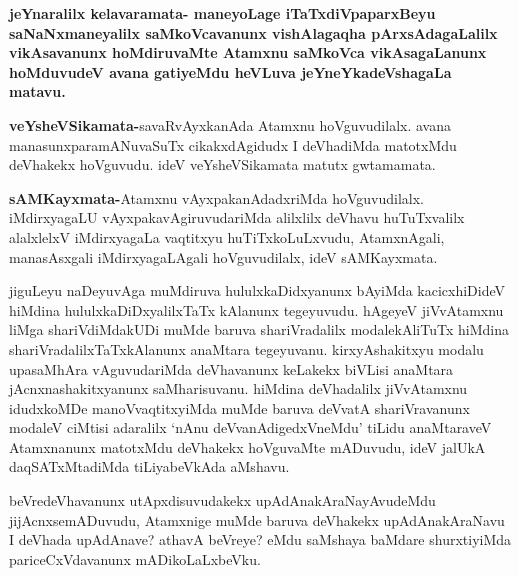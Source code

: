 \begin{artha}
\textbf{jeYnaralilx kelavaramata- maneyoLage iTaTxdiVpaparxBeyu saNaNxmaneyalilx saMkoVcavanunx vishAlagaqha pArxsAdagaLalilx vikAsavanunx hoMdiruvaMte Atamxnu saMkoVca vikAsagaLanunx hoMduvudeV avana gatiyeMdu heVLuva jeYneYkadeVshagaLa matavu.}
\end{artha}

\begin{artha}
\textbf{veYsheVSikamata-}savaRvAyxkanAda Atamxnu hoVguvudilalx. avana manasunxparamANuvaSuTx cikakxdAgidudx I deVhadiMda matotxMdu deVhakekx hoVguvudu. ideV veYsheVSikamata matutx gwtamamata.
\end{artha}

\begin{artha}
\textbf{sAMKayxmata-}Atamxnu vAyxpakanAdadxriMda hoVguvudilalx. iMdirxyagaLU vAyxpakavAgiruvudariMda alilxlilx deVhavu huTuTxvalilx alalxlelxV iMdirxyagaLa vaqtitxyu huTiTxkoLuLxvudu, AtamxnAgali, manasAsxgali iMdirxyagaLAgali hoVguvudilalx, ideV sAMKayxmata.
\end{artha}


\begin{artha}
jiguLeyu naDeyuvAga muMdiruva hululxkaDidxyanunx bAyiMda kacicxhiDideV hiMdina hululxkaDiDxyalilxTaTx kAlanunx tegeyuvudu. hAgeyeV jiVvAtamxnu liMga shariVdiMdakUDi muMde baruva shariVradalilx modalekAliTuTx hiMdina shariVradalilxTaTxkAlanunx anaMtara tegeyuvanu. kirxyAshakitxyu modalu upasaMhAra vAguvudariMda deVhavanunx keLakekx biVLisi anaMtara jAcnxnashakitxyanunx saMharisuvanu. hiMdina deVhadalilx jiVvAtamxnu idudxkoMDe manoVvaqtitxyiMda muMde baruva deVvatA shariVravanunx modaleV ciMtisi adaralilx  `nAnu deVvanAdigedxVneMdu' tiLidu anaMtaraveV Atamxnanunx matotxMdu deVhakekx hoVguvaMte mADuvudu, ideV jalUkA daqSATxMtadiMda tiLiyabeVkAda aMshavu.
\end{artha}


\begin{artha}
beVredeVhavanunx utApxdisuvudakekx upAdAnakAraNayAvudeMdu jijAcnxsemADuvudu, Atamxnige muMde baruva deVhakekx upAdAnakAraNavu I deVhada upAdAnave? athavA beVreye? eMdu saMshaya baMdare shurxtiyiMda pariceCxVdavanunx mADikoLaLxbeVku.
\end{artha}


